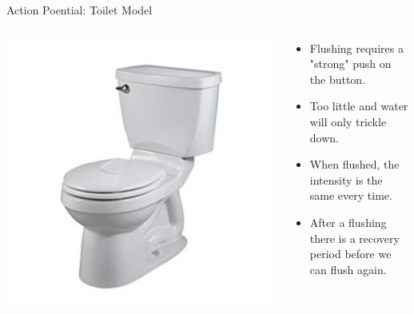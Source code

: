 \documentclass[aspectratio=169]{beamer}
\begin{document}
\begin{frame}{Action Poential: Toilet Model}
    \begin{columns}
        \begin{column}{0.28\textwidth}
            \begin{center}
                \includegraphics[width=\textwidth]{images/toilet.jpg}
            \end{center}
        \end{column}
        \begin{column}{0.68\textwidth}
            \begin{itemize}
                \item Flushing requires a "strong" push on the button. 
                \item Too little and water will only trickle down. 
                \item When flushed, the intensity is the same every time. 
                \item After a flushing there is a recovery period before we can flush again.
            \end{itemize}
        \end{column}
    \end{columns}
\end{frame}
\end{document}
